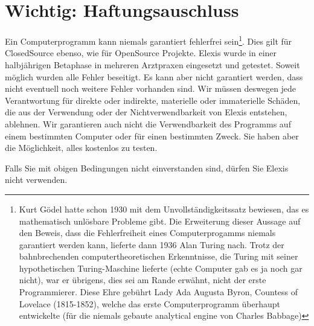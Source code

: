 \documentclass[paper=a4,BCOR8.25mm,twoside]{scrbook}
\begin{document}
\section{Wichtig: Haftungsauschluss}
Ein Computerprogramm kann niemals garantiert fehlerfrei sein\footnote{Kurt Gödel hatte schon 1930 mit dem Unvollständigkeitssatz bewiesen, das es mathematisch unlösbare Probleme gibt. Die Erweiterung dieser Aussage auf den Beweis, dass die Fehlerfreiheit eines Computerprogamms niemals garantiert werden kann, lieferte dann 1936 Alan Turing nach. Trotz der bahnbrechenden computertheoretischen Erkenntnisse, die Turing mit seiner hypothetischen Turing-Maschine lieferte (echte Computer gab es ja noch gar nicht), war er übrigens, dies sei am Rande erwähnt, nicht der erste Programmierer. Diese Ehre gebührt Lady Ada Augusta Byron, Countess of Lovelace (1815-1852), welche das erste Computerprogramm überhaupt entwickelte (für die niemals gebaute analytical engine von Charles Babbage)}. Dies gilt für ClosedSource ebenso, wie für OpenSource Projekte. Elexis wurde in einer halbjährigen Betaphase in mehreren Arztpraxen eingesetzt und getestet. Soweit möglich wurden alle Fehler beseitigt. Es kann aber nicht garantiert werden, dass nicht eventuell noch weitere Fehler vorhanden sind. Wir müssen deswegen jede Verantwortung für direkte oder indirekte, materielle oder immaterielle Schäden, die aus der Verwendung oder der Nichtverwendbarkeit von Elexis entstehen, ablehnen. Wir garantieren auch nicht die Verwendbarkeit des Programms auf einem bestimmten Computer oder für einen bestimmten Zweck. Sie haben aber die Möglichkeit, alles kostenlos zu testen.

Falls Sie mit obigen Bedingungen nicht einverstanden sind, dürfen Sie Elexis nicht verwenden.
\end{document}
